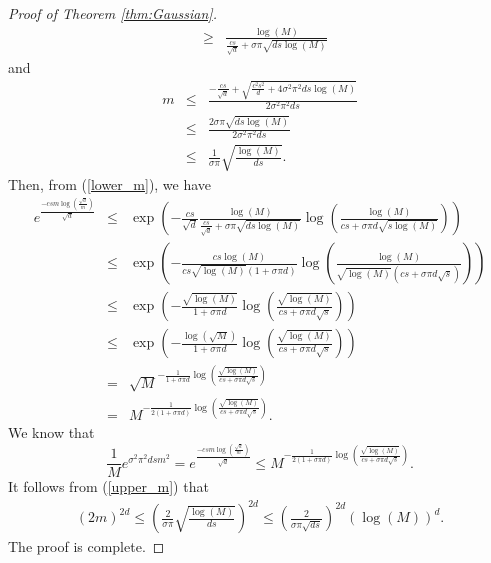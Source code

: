 \documentclass{article}
\numberwithin{equation}{section}
\begin{document}
\begin{appendices}
\begin{proof}[Proof of Theorem \ref{thm:Gaussian}]
\begin{eqnarray}
        &\geq& \frac{\log(M)}{\frac{cs}{\sqrt{d}} + \sigma \pi \sqrt{ds \log(M)}}
    \end{eqnarray}
    and 
    \begin{eqnarray}\label{upper_m}
        m &\leq& \frac{-\frac{cs}{\sqrt{d}} + \sqrt{\frac{c^2s^2}{d}+4\sigma^2\pi^2ds \log(M)}}{2\sigma^2\pi^2ds}\nonumber\\
        &\leq&  \frac{ 2\sigma \pi \sqrt{ds \log(M)}}{2\sigma^2\pi^2ds}\nonumber\\
        &\leq&  \frac{1}{\sigma \pi}\sqrt{\frac{\log(M)}{ds}}.
    \end{eqnarray}
Then, from (\ref{lower_m}), we have 
\begin{eqnarray*}
  e^{\frac{-csm\log \left(\frac{\sqrt{d}}{m}\right)}{\sqrt{d}}} 
  &\leq& \exp\left(-\frac{cs}{\sqrt{d}}\frac{\log(M)}{\frac{cs}{\sqrt{d}} + \sigma \pi \sqrt{ds \log(M)}}\log \left(\frac{\log (M)}{cs+ \sigma \pi d\sqrt{s\log (M)}}\right)\right)\\
   &\leq& \exp\left(-\frac{cs\log(M)}{cs\sqrt{\log(M)} (1+ \sigma \pi d)}\log \left(\frac{\log (M)}{\sqrt{\log (M)}(cs+ \sigma \pi d\sqrt{s})}\right)\right)\\
    &\leq& \exp\left(-\frac{\sqrt{\log(M)}}{1+ \sigma \pi d}\log \left(\frac{\sqrt{\log (M)}}{cs+ \sigma \pi d\sqrt{s}}\right)\right)\\
     &\leq& \exp\left(-\frac{\log(\sqrt{M})}{1+ \sigma \pi d}\log \left(\frac{\sqrt{\log (M)}}{cs+ \sigma \pi d\sqrt{s}}\right)\right)\\
     &=& \sqrt{M}^{-\frac{1}{1+ \sigma \pi d}\log \left(\frac{\sqrt{\log(M)}}{cs+ \sigma \pi d\sqrt{s}}\right)}\\
     &=& M^{-\frac{1}{2(1+ \sigma \pi d)}\log \left(\frac{\sqrt{\log(M)}}{cs+ \sigma \pi d\sqrt{s}}\right)}.
\end{eqnarray*}
We know that 
\begin{equation*}
    \frac{1}{M}e^{\sigma^2\pi^2dsm^2} = e^{\frac{-csm\log \left(\frac{\sqrt{d}}{m}\right)}{\sqrt{d}}} \leq M^{-\frac{1}{2(1+ \sigma \pi d)}\log \left(\frac{\sqrt{\log(M)}}{cs+ \sigma \pi d\sqrt{s}}\right)}. 
\end{equation*}
It follows from (\ref{upper_m}) that 
\begin{eqnarray*}
    (2m)^{2d} \leq \left(\frac{2}{\sigma \pi}\sqrt{\frac{\log(M)}{ds}}\right)^{2d} \leq \left(\frac{2}{\sigma \pi \sqrt{ds}}\right)^{2d}(\log (M))^d.
\end{eqnarray*}
The proof is complete.
\end{proof}




\end{appendices}
\end{document}
